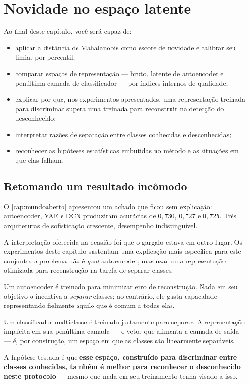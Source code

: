 \chapter{Novidade no espaço latente}
\label{cap:mahalanobis}

\begin{objetivos}
Ao final deste capítulo, você será capaz de:
\begin{itemize}[leftmargin=*,itemsep=0.2em]
  \item aplicar a distância de Mahalanobis como escore de novidade e calibrar seu limiar
        por percentil;
  \item comparar espaços de representação --- bruto, latente de autoencoder e penúltima
        camada de classificador --- por índices internos de qualidade;
  \item explicar por que, nos experimentos apresentados, uma representação treinada
        para discriminar supera uma treinada para reconstruir na detecção do desconhecido;
  \item interpretar razões de separação entre classes conhecidas e desconhecidas;
  \item reconhecer as hipóteses estatísticas embutidas no método e as situações em que
        elas falham.
\end{itemize}
\end{objetivos}

\section{Retomando um resultado incômodo}

O \cref{cap:mundoaberto} apresentou um achado que ficou sem explicação: autoencoder,
VAE e DCN produziram acurácias de $0{,}730$, $0{,}727$ e $0{,}725$. Três arquiteturas de
sofisticação crescente, desempenho indistinguível.

A interpretação oferecida na ocasião foi que o gargalo estava em outro lugar. Os
experimentos deste capítulo sustentam uma explicação mais específica para este conjunto:
o problema não é \emph{qual} autoencoder, mas usar uma representação otimizada para
reconstrução na tarefa de separar classes.

\begin{destaque}
Um autoencoder é treinado para minimizar erro de reconstrução. Nada em seu objetivo o
incentiva a \emph{separar} classes; ao contrário, ele gasta capacidade representando
fielmente aquilo que é comum a todas elas.

Um classificador multiclasse é treinado justamente para separar. A representação
implícita em sua penúltima camada --- o vetor que alimenta a camada de saída --- é,
por construção, um espaço em que as classes são linearmente separáveis.

A hipótese testada é que \textbf{esse espaço, construído para discriminar entre classes
conhecidas, também é melhor para reconhecer o desconhecido neste protocolo} --- mesmo
que nada em seu treinamento tenha visado a isso.
\end{destaque}

